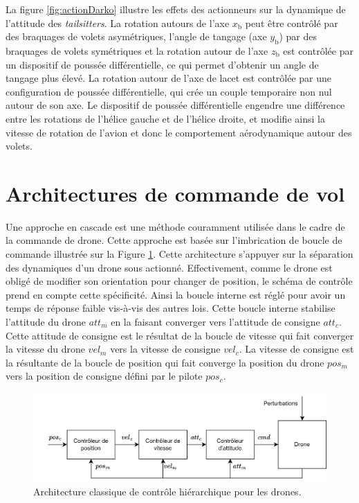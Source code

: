 La figure \ref{fig:actionDarko} illustre les effets des actionneurs sur la dynamique de l'attitude des \textit{tailsitters}. La rotation autours de l'axe $x_{\text{b}}$ peut être contrôlé par des braquages de volets asymétriques, l'angle de tangage (axe $y_{\text{b}}$) par des braquages de volets symétriques et la rotation autour de l'axe $z_{\text{b}}$ est contrôlée par un dispositif de poussée différentielle, ce qui permet d'obtenir un angle de tangage plus élevé. La rotation autour de l'axe de lacet est contrôlée par une configuration de poussée différentielle, qui crée un couple temporaire non nul autour de son axe. Le dispositif de poussée différentielle engendre une différence entre les rotations de l'hélice gauche et de l'hélice droite, et modifie ainsi la vitesse de rotation de l'avion et donc le comportement aérodynamique autour des volets.


\section{Architectures de commande de vol}


Une approche en cascade est une méthode couramment utilisée dans le cadre de la commande de drone. Cette approche est basée sur l'imbrication de boucle de  commande illustrée sur la Figure \ref{fig:schemahiera}. 
Cette architecture s'appuyer sur la séparation des dynamiques d'un drone sous actionné. Effectivement, comme le drone est obligé de modifier son orientation pour changer de position, le schéma de contrôle prend en compte cette spécificité. Ainsi la boucle interne est réglé pour avoir un temps de réponse faible vis-à-vis des autres lois. Cette boucle interne stabilise l'attitude du drone $att_{m}$ en la faisant converger vers l'attitude de consigne $att_{c}$. Cette attitude de consigne est le résultat de la boucle de vitesse qui fait converger la vitesse du drone $vel_{m}$ vers la vitesse de consigne $vel_{c}$. La vitesse de consigne est la résultante de la boucle de position qui fait converge la position du drone $pos_{m}$ vers la position de consigne défini par le pilote $pos_{c}$.
\begin{figure}[ht!]
    \centerline{
    \includegraphics[trim=0cm 0cm 0cm 0cm,clip,width=0.8\columnwidth]{figures/controlhierachique.png}}
    \caption{Architecture classique de contrôle hiérarchique pour les drones.}
    \label{fig:schemahiera}
\end{figure}


